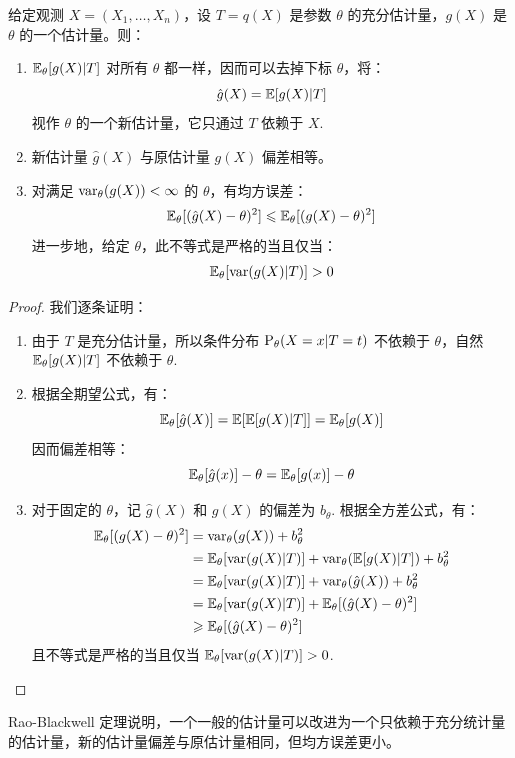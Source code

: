 \begin{theorem}
给定观测 $X=(X_1,\ldots,X_n)$，设 $T=q(X)$ 是参数 $\theta$ 的充分估计量，$g(X)$ 是 $\theta$ 的一个估计量。则：
\begin{enumerate}
    \item $\mathbb{E}_\theta[g(X)\vert T]$ 对所有 $\theta$ 都一样，因而可以去掉下标 $\theta$，将：
    \[
    \hat g(X)=\mathbb{E}[g(X)\vert T]
    \]
    视作 $\theta$ 的一个新估计量，它只通过 $T$ 依赖于 $X$.
    \item 新估计量 $\hat g(X)$ 与原估计量 $g(X)$ 偏差相等。
    \item 对满足 $\mathrm{var}_\theta(g(X))<\infty$ 的 $\theta$，有均方误差：
    \[
    \mathbb{E}_\theta[(\hat g(X)-\theta)^2]\leqslant\mathbb{E}_\theta[(g(X)-\theta)^2]
    \]
    进一步地，给定 $\theta$，此不等式是严格的当且仅当：
    \[
    \mathbb{E}_\theta[\mathrm{var}(g(X)\vert T)]>0
    \]
\end{enumerate}
\end{theorem}
\begin{proof}
我们逐条证明：
\begin{enumerate}
    \item 由于 $T$ 是充分估计量，所以条件分布 $\mathrm{P}_\theta(X=x\vert T=t)$ 不依赖于 $\theta$，自然 $\mathbb{E}_\theta[g(X)\vert T]$ 不依赖于 $\theta$.
    \item 根据全期望公式，有：
    \[
    \mathbb{E}_\theta[\hat g(X)]=\mathbb{E}[\mathbb{E}[g(X)\vert T]]=\mathbb{E}_\theta[g(X)]
    \]
    因而偏差相等：
    \[
    \mathbb{E}_\theta[\hat g(x)]-\theta=\mathbb{E}_\theta[g(x)]-\theta
    \]
    \item 对于固定的 $\theta$，记 $\hat g(X)$ 和 $g(X)$ 的偏差为 $b_\theta$. 根据全方差公式，有：
    \begin{align*}
    \mathbb{E}_\theta[(g(X)-\theta)^2]&=\mathrm{var}_\theta(g(X))+b_\theta^2\\
    &=\mathbb{E}_\theta[\mathrm{var}(g(X)\vert T)]+\mathrm{var}_\theta(\mathbb{E}[g(X)\vert T])+b_\theta^2\\
    &=\mathbb{E}_\theta[\mathrm{var}(g(X)\vert T)]+\mathrm{var}_\theta(\hat g(X))+b_\theta^2\\
    &=\mathbb{E}_\theta[\mathrm{var}(g(X)\vert T)]+\mathbb{E}_\theta[(\hat g(X)-\theta)^2]\\
    &\geqslant\mathbb{E}_\theta[(\hat g(X)-\theta)^2]
    \end{align*}
    且不等式是严格的当且仅当 $\mathbb{E}_\theta[\mathrm{var}(g(X)\vert T)]>0$.
\end{enumerate}
\end{proof}
\begin{remark}
Rao-Blackwell 定理说明，一个一般的估计量可以改进为一个只依赖于充分统计量的估计量，新的估计量偏差与原估计量相同，但均方误差更小。
\end{remark}

